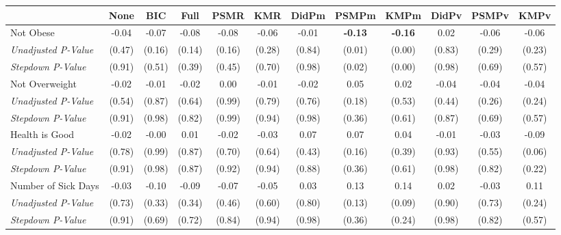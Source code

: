 \begin{tabular}{l c c c c c c c c c c c}
\toprule
 & None & BIC & Full & PSMR & KMR & DidPm & PSMPm & KMPm & DidPv & PSMPv & KMPv \\
\midrule
Not Obese & -0.04 & -0.07 & -0.08 & -0.08 & -0.06 & -0.01 & \textbf{ -0.13 } & \textbf{ -0.16 } & 0.02 & -0.06 & -0.06 \\
\quad \textit{Unadjusted P-Value} & (0.47) & (0.16) & (0.14) & (0.16) & (0.28) & (0.84) & (0.01) & (0.00) & (0.83) & (0.29) & (0.23) \\
\quad \textit{Stepdown P-Value} & (0.91) & (0.51) & (0.39) & (0.45) & (0.70) & (0.98) & (0.02) & (0.00) & (0.98) & (0.69) & (0.57) \\
Not Overweight & -0.02 & -0.01 & -0.02 & 0.00 & -0.01 & -0.02 & 0.05 & 0.02 & -0.04 & -0.04 & -0.04 \\
\quad \textit{Unadjusted P-Value} & (0.54) & (0.87) & (0.64) & (0.99) & (0.79) & (0.76) & (0.18) & (0.53) & (0.44) & (0.26) & (0.24) \\
\quad \textit{Stepdown P-Value} & (0.91) & (0.98) & (0.82) & (0.99) & (0.94) & (0.98) & (0.36) & (0.61) & (0.87) & (0.69) & (0.57) \\
Health is Good & -0.02 & -0.00 & 0.01 & -0.02 & -0.03 & 0.07 & 0.07 & 0.04 & -0.01 & -0.03 & -0.09 \\
\quad \textit{Unadjusted P-Value} & (0.78) & (0.99) & (0.87) & (0.70) & (0.64) & (0.43) & (0.16) & (0.39) & (0.93) & (0.55) & (0.06) \\
\quad \textit{Stepdown P-Value} & (0.91) & (0.98) & (0.87) & (0.92) & (0.94) & (0.88) & (0.36) & (0.61) & (0.98) & (0.82) & (0.22) \\
Number of Sick Days & -0.03 & -0.10 & -0.09 & -0.07 & -0.05 & 0.03 & 0.13 & 0.14 & 0.02 & -0.03 & 0.11 \\
\quad \textit{Unadjusted P-Value} & (0.73) & (0.33) & (0.34) & (0.46) & (0.60) & (0.80) & (0.13) & (0.09) & (0.90) & (0.73) & (0.24) \\
\quad \textit{Stepdown P-Value} & (0.91) & (0.69) & (0.72) & (0.84) & (0.94) & (0.98) & (0.36) & (0.24) & (0.98) & (0.82) & (0.57) \\
\bottomrule
\end{tabular}
